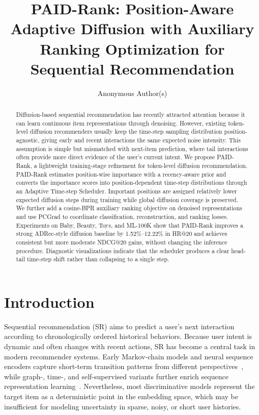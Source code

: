 \documentclass[runningheads,a4paper]{llncs}
\title{PAID-Rank: Position-Aware Adaptive Diffusion with Auxiliary Ranking Optimization for Sequential Recommendation}
\author{Anonymous Author(s)}
\institute{Anonymous Institution}
\begin{document}
\maketitle

\begin{abstract}
Diffusion-based sequential recommendation has recently attracted attention because it can learn continuous item representations through denoising. However, existing token-level diffusion recommenders usually keep the time-step sampling distribution position-agnostic, giving early and recent interactions the same expected noise intensity. This assumption is simple but mismatched with next-item prediction, where tail interactions often provide more direct evidence of the user's current intent. We propose PAID-Rank, a lightweight training-stage refinement for token-level diffusion recommendation. PAID-Rank estimates position-wise importance with a recency-aware prior and converts the importance scores into position-dependent time-step distributions through an Adaptive Time-step Scheduler. Important positions are assigned relatively lower expected diffusion steps during training while global diffusion coverage is preserved. We further add a cosine-BPR auxiliary ranking objective on denoised representations and use PCGrad to coordinate classification, reconstruction, and ranking losses. Experiments on Baby, Beauty, Toys, and ML-100K show that PAID-Rank improves a strong ADRec-style diffusion baseline by 1.52\%--12.22\% in HR@20 and achieves consistent but more moderate NDCG@20 gains, without changing the inference procedure. Diagnostic visualizations indicate that the scheduler produces a clear head-tail time-step shift rather than collapsing to a single step.
\end{abstract}

\section{Introduction}
\label{sec:introduction}

Sequential recommendation (SR) aims to predict a user's next interaction according to chronologically ordered historical behaviors. Because user intent is dynamic and often changes with recent actions, SR has become a central task in modern recommender systems. Early Markov-chain models and neural sequence encoders capture short-term transition patterns from different perspectives~\cite{rendle2010fpmc,hidasi2016gru4rec,tang2018caser,kang2018sasrec}, while graph-, time-, and self-supervised variants further enrich sequence representation learning~\cite{wu2019srgnn,li2020tisasrec,zhou2020s3rec}. Nevertheless, most discriminative models represent the target item as a deterministic point in the embedding space, which may be insufficient for modeling uncertainty in sparse, noisy, or short user histories.
\end{document}
